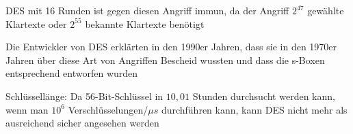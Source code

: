 \documentclass[a4paper]{article}
\begin{document}
\begin{multicols}{3}
\begin{itemize*}
\begin{itemize*}
                  \item DES mit 16 Runden ist gegen diesen Angriff immun, da der Angriff $2^{47}$ gewählte Klartexte oder $2^{55}$ bekannte Klartexte benötigt
                  \item Die Entwickler von DES erklärten in den 1990er Jahren, dass sie in den 1970er Jahren über diese Art von Angriffen Bescheid wussten und dass die s-Boxen entsprechend entworfen wurden
            \end{itemize*}
            \item Schlüssellänge:  Da 56-Bit-Schlüssel in $10,01$ Stunden durchsucht werden kann, wenn man $10^6$ Verschlüsselungen/$\mu s$ durchführen kann, kann DES nicht mehr als ausreichend sicher angesehen werden
      \end{itemize*}


\end{multicols}
\end{document}
